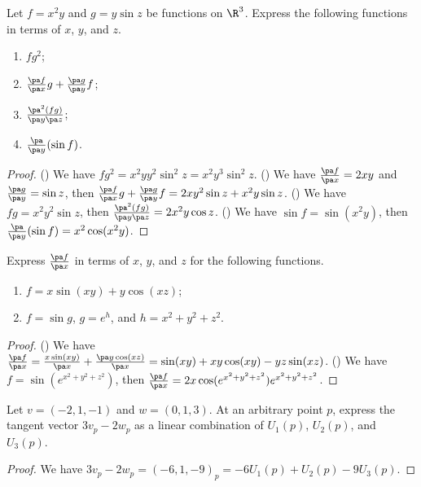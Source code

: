 \newpage
{}
\begin{exercise}[1.1.1]
    Let $f={x}^{2}y$ and $g=y\sin z$ be functions on ${\R}^{3}$. Express the following functions in terms of $x$, $y$, and $z$.
    \begin{enumerate}
        \item $f{g}^{2}$;
        \item $\frac{\pa f}{\pa x}g+\frac{\pa g}{\pa y}f$;
        \item $\frac{{\pa}^{2}(fg)}{\pa y\pa z}$;
        \item $\frac{\pa}{\pa y}(\sin f)$.
    \end{enumerate}
\end{exercise}
\begin{proof}
    () We have $f{g}^{2}={x}^{2}y{y}^{2}{\sin}^{2}z={x}^{2}{y}^{3}{\sin}^{2}z$. () We have $\frac{\pa f}{\pa x}=2xy$ and $\frac{\pa g}{\pa y}=\sin z$, then $\frac{\pa f}{\pa x}g+\frac{\pa g}{\pa y}f=2x{y}^{2}\sin z+{x}^{2}y\sin z$. () We have $fg={x}^{2}{y}^{2}\sin z$, then $\frac{{\pa}^{2}(fg)}{\pa y\pa z}=2{x}^{2}y\cos z$. () We have $\sin f=\sin({x}^{2}y)$, then $\frac{\pa}{\pa y}(\sin f)={x}^{2}\cos({x}^{2}y)$.
\end{proof}
\begin{exercise}[1.1.3]
    Express $\frac{\pa f}{\pa x}$ in terms of $x$, $y$, and $z$ for the following functions.
    \begin{enumerate}
        \item $f=x\sin(xy)+y\cos(xz)$;
        \item $f=\sin g$, $g={e}^{h}$, and $h={x}^{2}+{y}^{2}+{z}^{2}$.
    \end{enumerate}
\end{exercise}
\begin{proof}
    () We have $\frac{\pa f}{\pa x}=\frac{x\sin(xy)}{\pa x}+\frac{\pa y\cos(xz)}{\pa x}=\sin(xy)+xy\cos(xy)-yz\sin(xz)$. () We have $f=\sin({e}^{{x}^{2}+{y}^{2}+{z}^{2}})$, then $\frac{\pa f}{\pa x}=2x\cos({e}^{{x}^{2}+{y}^{2}+{z}^{2}}){e}^{{x}^{2}+{y}^{2}+{z}^{2}}$.
\end{proof}
\begin{exercise}[1.2.1]
    Let $v=(-2,1,-1)$ and $w=(0,1,3)$. At an arbitrary point $p$, express the tangent vector $3{v}_{p}-2{w}_{p}$ as a linear combination of ${U}_{1}(p)$, ${U}_{2}(p)$, and ${U}_{3}(p)$.
\end{exercise}
\begin{proof}
    We have $3{v}_{p}-2{w}_{p}={(-6,1,-9)}_{p}=-6{U}_{1}(p)+{U}_{2}(p)-9{U}_{3}(p)$.
\end{proof}
